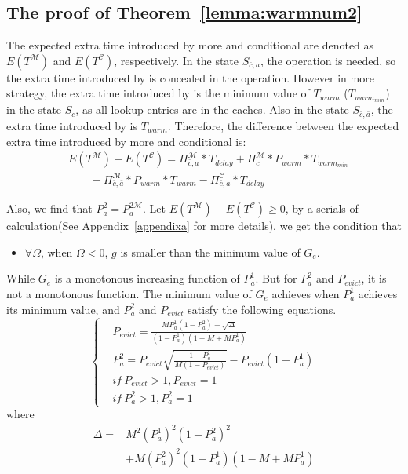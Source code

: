 \subsection{The proof of Theorem~\ref{lemma:warmnum2}}
The expected extra time introduced by more {\vwarm} and conditional {\vwarm}  are denoted as $E(T^{\mathcal{M}})$ and $E(T^{\mathcal{C}})$, respectively.
In the state $S_{\bar{c}, a}$, the {\vdelay} operation is needed,
so the extra time introduced by {\vwarm} is concealed in the {\vdelay} operation.
 However in more {\vwarm} strategy,
the extra time introduced by {\vwarm} is the minimum value of $T_{warm}$ ($T_{warm_{min}}$) in the state $S_{c}$, as all lookup entries are in the caches.
  Also in the state $S_{\bar{c}, \bar{a}}$, the extra time introduced by {\vwarm} is $T_{warm}$.
Therefore, the difference between the expected extra time introduced by more {\vwarm} and conditional {\vwarm} is:
\begin{align}
\label{equ:tpc2}
&E(T^{\mathcal{M}})-E(T^{\mathcal{C}})=\Pi_{\bar{c}, a}^{\mathcal{M}} * T_{delay} + \Pi_{c}^{\mathcal{M}}*P_{warm}*T_{warm_{min}} \nonumber \\
 &\ \ \ \ \ \ \ \ \ + \Pi_{\bar{c}, \bar{a}}^{\mathcal{M}}*P_{warm}*T_{warm} - \Pi_{\bar{c}, a}^{\mathcal{C}} * T_{delay}
\end{align}

Also, we find that $P_{a}^{\mathfrak{2}} = P_{a}^{\mathfrak{2}\mathcal{M}}$.
Let $E(T^{\mathcal{M}})-E(T^{\mathcal{C}}) \geq 0$,
by a serials of calculation(See Appendix~\ref{appendixa} for more details),
  we get the condition that
\begin{itemize}
  \item
    $\forall \Omega$, when  $\Omega < 0$, $g$ is smaller than the minimum value of $G_e$.
\end{itemize}

While $G_e$ is a monotonous increasing function of $P_{a}^{\mathfrak{1}}$. But for $P_{a}^{\mathfrak{2}}$ and $P_{evict}$, it is not a monotonous function.
The minimum value of $G_e$ achieves when $P_{a}^{\mathfrak{1}}$ achieves its minimum value, and $P_{a}^{\mathfrak{2}}$ and $P_{evict}$ satisfy the following equations.
\begin{equation}
\label{equ:g}
\left\{
\begin{split}
&P_{evict} = \frac{MP_{a}^{\mathfrak{1}}(1-P_{a}^{\mathfrak{2}})+\sqrt{\Delta}}{(1-P_{a}^{\mathfrak{1}})(1-M+MP_{a}^{\mathfrak{1}})} \\
&P_{a}^{\mathfrak{2}} = P_{evict}\sqrt{\frac{1-P_{a}^{\mathfrak{1}}}{M(1-P_{evict})}}-P_{evict}(1-P_{a}^{\mathfrak{1}}) \\
& if\  P_{evict} >1, P_{evict} = 1 \\
& if\  P_{a}^{\mathfrak{2}} >1, P_{a}^{\mathfrak{2}} = 1
\end{split}
\right.
\end{equation}
where
\begin{align}
\Delta = &M^{2}(P_{a}^{\mathfrak{1}})^{2}(1-P_{a}^{\mathfrak{2}})^2 \nonumber \\
&+ M(P_{a}^{\mathfrak{2}})^{2}(1-P_{a}^\mathfrak{1})(1-M+MP_{a}^{\mathfrak{1}}) \nonumber
\end{align}

